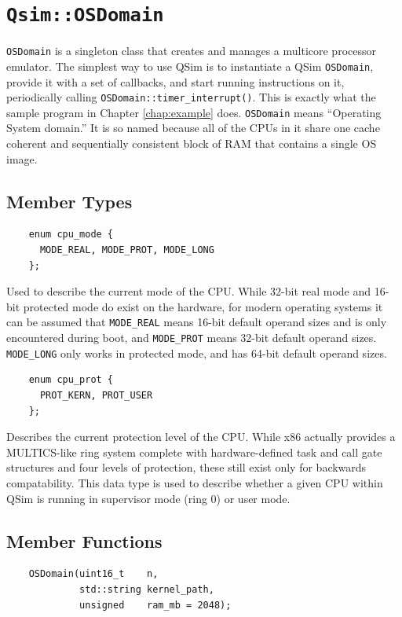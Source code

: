 \documentclass[letterpaper, 10pt]{book}
\begin{document}
\section{\texttt{Qsim::OSDomain}} \label{class:OSDomain}

\texttt{OSDomain} is a singleton class that creates and manages a multicore
processor emulator. The simplest way to use QSim is to instantiate a QSim
\texttt{OSDomain}, provide it with a set of callbacks, and start running instructions on it, periodically calling  \texttt{OSDomain::timer\_interrupt()}.
This is exactly what the sample program
in Chapter \ref{chap:example} does. \texttt{OSDomain} means ``Operating System
domain.'' It is so named because all of the CPUs in it share one cache coherent
and sequentially consistent block of RAM that contains a single OS image.

\subsection{Member Types}
\label{enum:cpu_mode} \begin{verbatim}
    enum cpu_mode {
      MODE_REAL, MODE_PROT, MODE_LONG
    };
\end{verbatim}

Used to describe the current mode of the CPU. While 32-bit real mode and 16-bit
protected mode do exist on the hardware, for modern operating systems it can be
assumed that \texttt{MODE\_REAL} means 16-bit default operand sizes and is only
encountered during boot, and \texttt{MODE\_PROT} means 32-bit default operand
sizes. \texttt{MODE\_LONG} only works in protected mode, and has 64-bit default
operand sizes.

\label{enum:cpu_prot} \begin{verbatim}
    enum cpu_prot {
      PROT_KERN, PROT_USER
    };
\end{verbatim}

Describes the current protection level of the CPU. While x86 actually provides
a MULTICS-like ring system complete with hardware-defined task and call gate
structures and four levels of protection, these still exist only for backwards
compatability. This data type is used to describe whether a given CPU within
QSim is running in supervisor mode (ring 0) or user mode.

\subsection{Member Functions}
\label{func:OSDomain} \begin{verbatim}
    OSDomain(uint16_t    n, 
             std::string kernel_path, 
             unsigned    ram_mb = 2048);
\end{verbatim}
\end{document}
